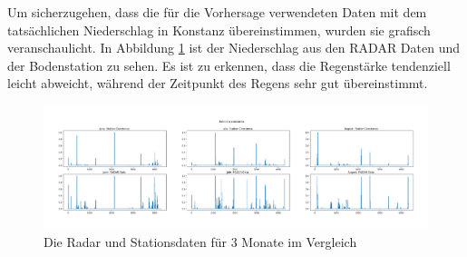 \noindent
Um sicherzugehen, dass die für die Vorhersage verwendeten Daten mit dem tatsächlichen Niederschlag in Konstanz übereinstimmen, wurden sie grafisch veranschaulicht. 
In Abbildung \ref{fig:radar_station_daten_vergleich} ist der Niederschlag aus den RADAR Daten und der Bodenstation zu sehen. 
Es ist zu erkennen, dass die Regenstärke tendenziell leicht abweicht, während der Zeitpunkt des Regens sehr gut übereinstimmt.  
\begin{figure}[H]
    \centering
    \includegraphics[width=1\textwidth,angle=0]{abb/radar_station_daten_vergleich}
    \caption[Radar und Stationsdaten]{Die Radar und Stationsdaten für 3 Monate im Vergleich}
   \label{fig:radar_station_daten_vergleich}
\end{figure}
 